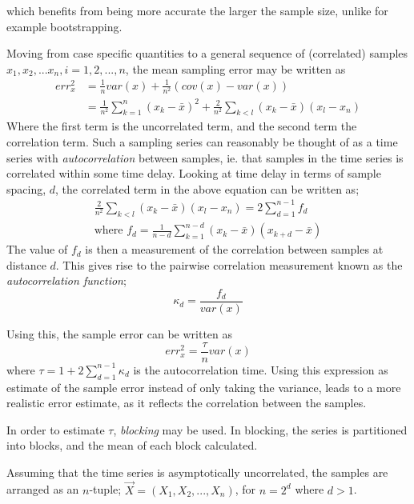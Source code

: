 \documentclass[%
oneside,                 %
final,                   %
10pt]{article}
\begin{document}
 which benefits from being more accurate the larger the sample size, unlike for example bootstrapping.


Moving from case specific quantities to a general sequence of (correlated) samples ${x_1,x_2,...x_n}, i=1,2,...,n$, the mean sampling error may be written as
\begin{align*}
err_{x}^2&= \frac{1}{n} var(x) + \frac{1}{n^2} \left(cov(x)-var(x)\right) \\
&= \frac{1}{n^2} \sum_{k=1}^n (x_k-\bar x)^2 + \frac{2}{n^2} \sum_{k<l}(x_k-\bar x)(x_l-x_n)
\end{align*}
Where the first term is the uncorrelated term, and the second term the correlation term. Such a sampling series can reasonably be thought of as a time series with \textit{autocorrelation} between samples, ie. that samples in the time series is correlated within some time delay. Looking at time delay in terms of sample spacing, $d$, the correlated term in the above equation can be written as;
\begin{align*}
\frac{2}{n^2} \sum_{k<l}(x_k-\bar x)(x_l-x_n) = 2 \sum_{d=1}^{n-1} f_d \\
\text{where } f_d=\frac{1}{n-d} \sum_{k=1}^{n-d}(x_k-\bar{x})(x_{k+d}-\bar{x})
\end{align*}
The value of $f_d$ is then a measurement of the correlation between samples at distance $d$. This gives rise to the pairwise correlation measurement known as the \textit{autocorrelation function};
\begin{equation}
\kappa_d=\frac{f_d}{var(x)}
\end{equation}

Using this, the sample error can be written as
\begin{equation}
err_{x}^2=\frac{\tau}{n} var(x)
\end{equation}
where $\tau=1+2\sum_{d=1}^{n-1}\kappa_d$ is the autocorrelation time. Using this expression as estimate of the sample error instead of only taking the variance, leads to a more realistic error estimate, as it reflects the correlation between the samples.

In order to estimate $\tau$, \textit{blocking} may be used. In blocking, the series is partitioned into blocks, and the mean of each block calculated. 




 Assuming that the time series is asymptotically uncorrelated, the samples are arranged as an $n$-tuple;
$\vec X = (X_1, X_2,...,X_n)$, for $n=2^d$ where $d>1$. 
\end{document}
